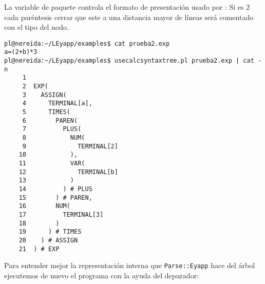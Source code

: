 La variable de paquete  controla el formato de presentación
usado por :
Si es 2 cada paréntesis cerrar que este a una distancia 
mayor de  líneas será comentado con el tipo del nodo. 


\begin{verbatim}
pl@nereida:~/LEyapp/examples$ cat prueba2.exp
a=(2+b)*3
pl@nereida:~/LEyapp/examples$ usecalcsyntaxtree.pl prueba2.exp | cat -n
     1
     2  EXP(
     3    ASSIGN(
     4      TERMINAL[a],
     5      TIMES(
     6        PAREN(
     7          PLUS(
     8            NUM(
     9              TERMINAL[2]
    10            ),
    11            VAR(
    12              TERMINAL[b]
    13            )
    14          ) # PLUS
    15        ) # PAREN,
    16        NUM(
    17          TERMINAL[3]
    18        )
    19      ) # TIMES
    20    ) # ASSIGN
    21  ) # EXP
\end{verbatim}


Para entender mejor la representación interna que \verb|Parse::Eyapp| hace del
árbol ejecutemos de nuevo el programa con la ayuda del depurador:

